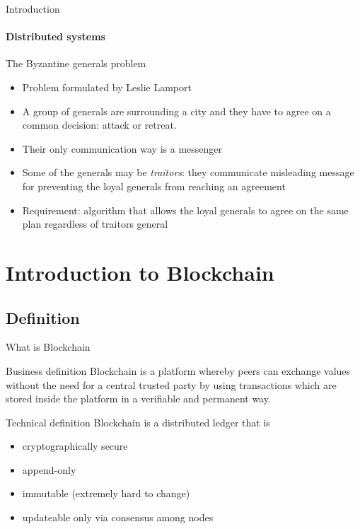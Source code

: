 \documentclass{beamer}
\begin{document}
  \begin{frame}{Introduction}
    \framesubtitle{Distributed systems}
    \begin{block}{The Byzantine generals problem}
      \begin{itemize}
        \item Problem formulated by Leslie Lamport \cite{lamport1982byzantine}
        \item A group of generals are surrounding a city and they have to agree
        on a common decision: attack or retreat.
        \item Their only communication way is a messenger
        \item Some of the generals may be \emph{traitors}: they communicate
        misleading message for preventing the loyal generals from reaching an
        agreement
        \item Requirement: algorithm that allows the loyal generals to agree
        on the same plan regardless of traitors general
      \end{itemize}
    \end{block}
  \end{frame}







  \section{Introduction to Blockchain}
  \subsection{Definition}

  \begin{frame}{What is Blockchain}
    \begin{block}{Business definition}
      Blockchain is a platform whereby peers can exchange values without the need
      for a central trusted party by using transactions which are stored inside
      the platform in a verifiable and permanent way.
    \end{block}

    \begin{block}{Technical definition}
      Blockchain is a distributed ledger that is
      \begin{itemize}
        \item cryptographically secure
        \item append-only
        \item immutable (extremely hard to change)
        \item updateable only via consensus among nodes
      \end{itemize}
    \end{block}
  \end{frame}
\end{document}
